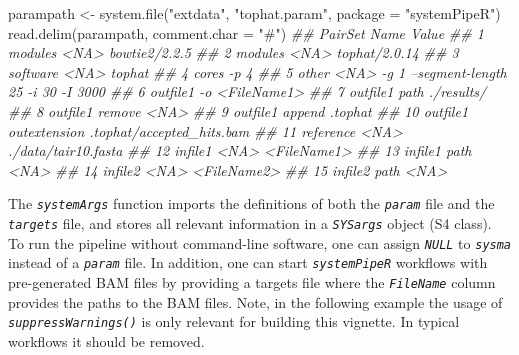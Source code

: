 \documentclass[14pt,]{article}
\newcommand{\hlstr}[1]{\textcolor[rgb]{0.251,0.627,0.251}{#1}}%
\newcommand{\hlcom}[1]{\textcolor[rgb]{0.502,0.502,0.502}{\textit{#1}}}%
\newcommand{\hlstd}[1]{\textcolor[rgb]{0.251,0.251,0.251}{#1}}%
\newcommand{\hlkwc}[1]{\textcolor[rgb]{0.251,0.251,0.251}{#1}}%
\newcommand{\hlkwd}[1]{\textcolor[rgb]{0.878,0.439,0.125}{#1}}%
\newenvironment{Shaded}{\begin{myshaded}}{\end{myshaded}}
\newcommand{\KeywordTok}[1]{\hlkwd{#1}}
\newcommand{\DataTypeTok}[1]{\hlkwc{#1}}
\newcommand{\StringTok}[1]{\hlstr{#1}}
\newcommand{\CommentTok}[1]{\hlcom{#1}}
\newcommand{\NormalTok}[1]{\hlstd{#1}}
\begin{document}
\begin{Shaded}
\begin{Highlighting}[]
\NormalTok{parampath <-}\StringTok{ }\KeywordTok{system.file}\NormalTok{(}\StringTok{"extdata"}\NormalTok{, }\StringTok{"tophat.param"}\NormalTok{, }\DataTypeTok{package =} \StringTok{"systemPipeR"}\NormalTok{)}
\KeywordTok{read.delim}\NormalTok{(parampath, }\DataTypeTok{comment.char =} \StringTok{"#"}\NormalTok{)}
\CommentTok{##      PairSet         Name                                  Value}
\CommentTok{## 1    modules         <NA>                          bowtie2/2.2.5}
\CommentTok{## 2    modules         <NA>                          tophat/2.0.14}
\CommentTok{## 3   software         <NA>                                 tophat}
\CommentTok{## 4      cores           -p                                      4}
\CommentTok{## 5      other         <NA> -g 1 --segment-length 25 -i 30 -I 3000}
\CommentTok{## 6   outfile1           -o                            <FileName1>}
\CommentTok{## 7   outfile1         path                             ./results/}
\CommentTok{## 8   outfile1       remove                                   <NA>}
\CommentTok{## 9   outfile1       append                                .tophat}
\CommentTok{## 10  outfile1 outextension              .tophat/accepted_hits.bam}
\CommentTok{## 11 reference         <NA>                    ./data/tair10.fasta}
\CommentTok{## 12   infile1         <NA>                            <FileName1>}
\CommentTok{## 13   infile1         path                                   <NA>}
\CommentTok{## 14   infile2         <NA>                            <FileName2>}
\CommentTok{## 15   infile2         path                                   <NA>}
\end{Highlighting}
\end{Shaded}

The \emph{\texttt{systemArgs}} function imports the definitions of both the \emph{\texttt{param}} file
and the \emph{\texttt{targets}} file, and stores all relevant information in a \emph{\texttt{SYSargs}}
object (S4 class). To run the pipeline without command-line software, one can
assign \emph{\texttt{NULL}} to \emph{\texttt{sysma}} instead of a \emph{\texttt{param}} file. In addition, one can
start \emph{\texttt{systemPipeR}} workflows with pre-generated BAM files by providing a
targets file where the \emph{\texttt{FileName}} column provides the paths to the BAM files.
Note, in the following example the usage of \emph{\texttt{suppressWarnings()}} is only relevant for
building this vignette. In typical workflows it should be removed.
\end{document}
